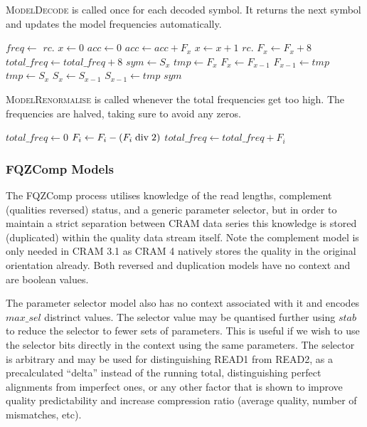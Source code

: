 \documentclass[a4paper]{article}
\begin{document}
\textsc{ModelDecode} is called once for each decoded symbol.
It returns the next symbol and updates the model frequencies automatically.

\begin{algorithmic}[1]
  \State $freq \gets$ $rc.$
  \State $x \gets 0$
  \State $acc \gets 0$
    \State $acc \gets acc + F_x$
    \State $x \gets x+1$
  \EndWhile
  \State $rc.$
  \State $F_x \gets F_x + 8$ 
  \State $total\_freq \gets total\_freq + 8$
    \State {}
  \EndIf
  \State $sym \gets S_x$
    \State $tmp \gets F_x$ 
    \State $F_x \gets F_{x-1}$
    \State $F_{x-1} \gets tmp$
    \State $tmp \gets S_x$ 
    \State $S_x \gets S_{x-1}$
    \State $S_{x-1} \gets tmp$
  \EndIf
  \State \Return $sym$
\EndFunction
\end{algorithmic}

\textsc{ModelRenormalise} is called whenever the total frequencies get too high.
The frequencies are halved, taking sure to avoid any zeros.

\begin{algorithmic}[1]
  \State $total\_freq \gets 0$
    \State $F_i \gets F_i - (F_i \bdiv 2)$
    \State $total\_freq \gets total\_freq + F_i$
  \EndFor
\EndProcedure
\end{algorithmic}

\subsubsection*{FQZComp Models}

The FQZComp process utilises knowledge of the read lengths, complement
(qualities reversed) status, and a generic parameter selector, but in
order to maintain a strict separation between CRAM data series this
knowledge is stored (duplicated) within the quality data stream
itself.  Note the complement model is only needed in CRAM 3.1 as CRAM
4 natively stores the quality in the original orientation already.
Both reversed and duplication models have no context and are boolean
values.

The parameter selector model also has no context associated with it
and encodes $max\_sel$ distrinct values.  The selector value may be
quantised further using $stab$ to reduce the selector to fewer
sets of parameters.  This is useful if we wish to use the selector
bits directly in the context using the same parameters.  The selector
is arbitrary and may be used for distinguishing READ1 from READ2, as
a precalculated ``delta'' instead of the running total, distinguishing
perfect alignments from imperfect ones, or any other factor that is
shown to improve quality predictability and increase compression
ratio (average quality, number of mismatches, etc).
\end{document}
